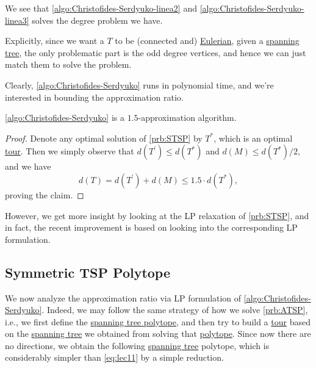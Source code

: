 \begin{remark}
	We see that \autoref{algo:Christofides-Serdyuko-linea2} and \autoref{algo:Christofides-Serdyuko-linea3} solves the degree problem we have.
\end{remark}
\begin{explanation}
	Explicitly, since we want a \(T\) to be (connected and) \href{https://en.wikipedia.org/wiki/Eulerian_path}{Eulerian}, given a \hyperref[def:spanning-tree]{spanning tree}, the only problematic part is the odd degree vertices, and hence we can just match them to solve the problem.
\end{explanation}

Clearly, \autoref{algo:Christofides-Serdyuko} runs in polynomial time, and we're interested in bounding the approximation ratio.

\begin{theorem}\label{thm:lec12-2}
	\autoref{algo:Christofides-Serdyuko} is a \(1.5\)-approximation algorithm.
\end{theorem}
\begin{proof}
	Denote any optimal solution of \autoref{prb:STSP} by \(T^{\ast} \), which is an optimal \hyperref[def:tour]{tour}. Then we simply observe that \(d(T^\prime ) \leq d(T^{\ast} )\) and \(d(M) \leq d(T^{\ast} ) / 2\), and we have
	\[
		d(T) = d(T^\prime ) + d(M) \leq 1.5\cdot d(T^{\ast} ),
	\]
	proving the claim.
\end{proof}

However, we get more insight by looking at the LP relaxation of \autoref{prb:STSP}, and in fact, the recent improvement is based on looking into the corresponding LP formulation.

\subsection{Symmetric TSP Polytope}
We now analyze the approximation ratio via LP formulation of \autoref{algo:Christofides-Serdyuko}. Indeed, we may follow the same strategy of how we solve \autoref{prb:ATSP}, i.e., we first define the \hyperref[eq:lec12-1]{spanning tree polytope}, and then try to build a \hyperref[def:tour]{tour} based on the \hyperref[def:spanning-tree]{spanning tree} we obtained from solving that \hyperref[eq:lec12-1]{polytope}. Since now there are no directions, we obtain the following \hyperref[def:spanning-tree]{spanning tree} polytope, which is considerably simpler than \autoref{eq:lec11} by a simple reduction.

